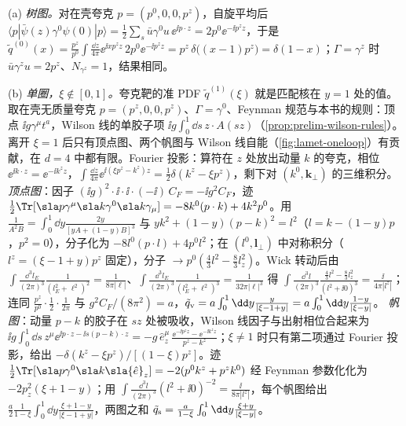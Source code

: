 \begin{example}\label{ex:lattice-quasi-tree}
(a) \emph{树图。}对在壳夸克 $p=(p^0,0,0,p^z)$，自旋平均后 $\langle p|\bar\psi(z)\gamma^0\psi(0)|p\rangle=\frac12\sum_s\bar u\gamma^0u\,\ee^{\ii p\cdot z}=2p^0\ee^{-\ii p^zz}$，于是 $\tilde q^{(0)}(x)=\frac{p^z}{p^0}\int\frac{\dd z}{4\pi}\ee^{\ii xp^zz}\,2p^0\ee^{-\ii p^zz}=p^z\,\delta\big((x-1)p^z\big)=\delta(1-x)$；$\Gamma=\gamma^z$ 时 $\bar u\gamma^zu=2p^z$、$N_{\gamma^z}=1$，结果相同。

(b) \emph{单圈，$\xi\notin[0,1]$。}夸克靶的准 PDF $\tilde q^{(1)}(\xi)$ 就是匹配核在 $y=1$ 处的值。取在壳无质量夸克 $p=(p^z,0,0,p^z)$、$\Gamma=\gamma^0$、Feynman 规范与本书的规则：顶点 $\ii g\gamma^\mu t^a$，Wilson 线的单胶子项 $\ii g\int_0^1\dd s\,z\cdot A(sz)$（\cref{prop:prelim-wilson-rules}）。离开 $\xi=1$ 后只有顶点图、两个帆图与 Wilson 线自能（\cref{fig:lamet-oneloop}）有贡献，在 $d=4$ 中都有限。Fourier 投影：算符在 $z$ 处放出动量 $k$ 的夸克，相位 $\ee^{\ii k\cdot z}=\ee^{-\ii k^zz}$，$\int\frac{\dd z}{4\pi}\ee^{\ii(\xi p^z-k^z)z}=\frac12\delta(k^z-\xi p^z)$，剩下对 $(k^0,\mathbf k_\perp)$ 的三维积分。
\emph{顶点图}：因子 $(\ii g)^2\cdot\ii\cdot\ii\cdot(-\ii)\,C_F=-\ii g^2C_F$，迹 $\frac12\Tr[\sla p\gamma^\mu\sla k\gamma^0\sla k\gamma_\mu]=-8k^0(p\cdot k)+4k^2p^0$。用 $\frac1{A^2B}=\int_0^1\dd y\frac{2y}{[yA+(1-y)B]^3}$ 与 $yk^2+(1-y)(p-k)^2=l^2$（$l=k-(1-y)p$，$p^2=0$），分子化为 $-8l^0(p\cdot l)+4p^0l^2$；在 $(l^0,\mathbf l_\perp)$ 中对称积分（$l^z=(\xi-1+y)p^z$ 固定），分子 $\to p^0(\frac43l^2-\frac83l_z^2)$。Wick 转动后由 $\int\frac{\dd^3l_E}{(2\pi)^3}\frac1{(l_E^2+\ell^2)^2}=\frac1{8\pi|\ell|}$、$\int\frac{\dd^3l_E}{(2\pi)^3}\frac1{(l_E^2+\ell^2)^3}=\frac1{32\pi|\ell|^3}$ 得 $\int\frac{\dd^3l}{(2\pi)^3}\frac{\frac43l^2-\frac83l_z^2}{(l^2+\ii0)^3}=\frac{\ii}{4\pi|l^z|}$；连同 $\frac{p^z}{p^0}\cdot\frac12\cdot\frac1{2\pi}$ 与 $g^2C_F/(8\pi^2)=a$，$\tilde q_{\rm v}=a\int_0^1\dd y\frac{y}{|\xi-1+y|}=a\int_0^1\dd y\frac{1-y}{|\xi-y|}$。
\emph{帆图}：动量 $p-k$ 的胶子在 $sz$ 处被吸收，Wilson 线因子与出射相位合起来为 $\ii g\int_0^1\dd s\,z^\mu\ee^{\ii p\cdot z-\ii s(p-k)\cdot z}=-g\,\hat e_z^\mu\,\frac{\ee^{-\ii p^zz}-\ee^{-\ii k^zz}}{p^z-k^z}$；$\xi\neq1$ 时只有第二项通过 Fourier 投影，给出 $-\delta(k^z-\xi p^z)/[(1-\xi)p^z]$。迹 $\frac12\Tr[\sla p\gamma^0\sla k\sla{\hat e}_z]=-2(p^0k^z+p^zk^0)$ 经 Feynman 参数化化为 $-2p_z^2(\xi+1-y)$；用 $\int\frac{\dd^3l}{(2\pi)^3}(l^2+\ii0)^{-2}=\frac{\ii}{8\pi|l^z|}$，每个帆图给出 $\frac a2\frac1{1-\xi}\int_0^1\dd y\frac{\xi+1-y}{|\xi-1+y|}$，两图之和 $\tilde q_{\rm s}=\frac a{1-\xi}\int_0^1\dd y\frac{\xi+y}{|\xi-y|}$。

\end{example}
